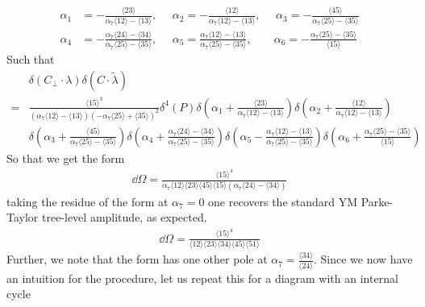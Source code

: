 \documentclass[letter,11pt]{article}
\newcommand{\ab}[1]{\langle #1 \rangle}
\begin{document}
\begin{equation}
	\begin{aligned}
\alpha_1&=-\frac{\ab{23}}{\alpha_7\ab{12}-\ab{13}},~~~~~~
\alpha_2=-\frac{\ab{12}}{\alpha_7\ab{12}-\ab{13}},~~~~~~
\alpha_3=-\frac{\ab{45}}{\alpha_7\ab{25}-\ab{35}}\\
\alpha_4&=-\frac{\alpha_7\ab{24}-\ab{34}}{\alpha_7\ab{25}-\ab{35}}
,~~~~~~
\alpha_5=\frac{\alpha_7\ab{12}-\ab{13}}{\alpha_7\ab{25}-\ab{35}}
,~~~~~~~~\,
\alpha_6=-\frac{\alpha_7\ab{25}-\ab{35}}{\ab{15}}
	\end{aligned}
\end{equation}
Such that
\begin{equation}
	\begin{aligned}
		&\delta(C_\perp\cdot \lambda)\delta(C\cdot\tilde \lambda)\\
		=&
		\frac{\ab{15}^3}{\left(\alpha_7\ab{12}-\ab{13}\right)
	\left(-\alpha_7\ab{25}+\ab{35}\right)^2	
	}\delta^4( P)
		\delta\left(\alpha_1+\frac{\ab{23}}{\alpha_7\ab{12}-\ab{13}}\right)
		\delta\left(\alpha_2+\frac{\ab{12}}{\alpha_7\ab{12}-\ab{13}}\right)\\&
		\delta\left(\alpha_3+\frac{\ab{45}}{\alpha_7\ab{25}-\ab{35}}\right)
		\delta\left(\alpha_4+\frac{\alpha_7\ab{24}-\ab{34}}{\alpha_7\ab{25}-\ab{35}}\right)
		\delta\left(\alpha_5-\frac{\alpha_7\ab{12}-\ab{13}}{\alpha_7\ab{25}-\ab{35}}\right)
		\delta\left(\alpha_6+\frac{\alpha_7\ab{25}-\ab{35}}{\ab{15}}\right)
	\end{aligned}
\end{equation}
So that we get the form
\begin{equation}
	\begin{aligned}
	\dd \Omega=	\frac{\ab{15}^4}{\alpha_7 \ab{12}\ab{23}\ab{45}\ab{15}\left(\alpha_7\ab{24}-\ab{34}\right)}
	\end{aligned}
\end{equation}
taking the residue of the form at $\alpha_7=0$ one recovers the standard YM Parke-Taylor tree-level amplitude, as expected.
\begin{equation}
	\begin{aligned}
		\dd \Omega=	\frac{\ab{15}^4}{ \ab{12}\ab{23}\ab{34}\ab{45}\ab{51}}
	\end{aligned}
\end{equation}
Further, we note that the form has one other pole at $\alpha_7=\frac{\ab{34}}{\ab{24}}$. Since we now have an intuition for the procedure, let us repeat this for a diagram with an internal cycle
\end{document}
